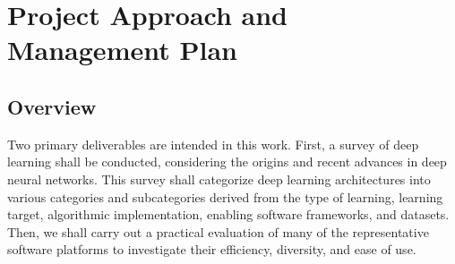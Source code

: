 \documentclass[12pt]{article}
\begin{document}
\section{Project Approach and Management Plan}

	\subsection{Overview}\hspace{4ex}Two primary deliverables are intended in this work. First, a survey of deep learning shall be conducted, considering the origins and recent advances in deep neural networks. This survey shall categorize deep learning architectures into various categories and subcategories derived from the type of learning, learning target, algorithmic implementation, enabling software frameworks, and datasets. Then, we shall carry out a practical evaluation of many of the representative software platforms to investigate their efficiency, diversity, and ease of use. 
	
\end{document}
